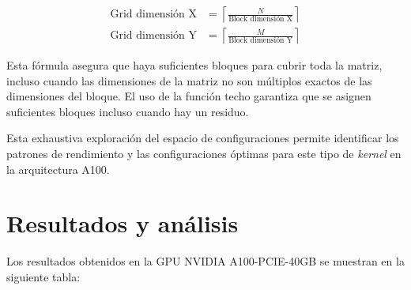         \begin{align*}
            \text{Grid dimensión X} &= \left\lceil \frac{N}{\text{Block dimensión X}} \right\rceil\\
            \text{Grid dimensión Y} &= \left\lceil \frac{M}{\text{Block dimensión Y}} \right\rceil
        \end{align*}
        
        Esta fórmula asegura que haya suficientes bloques para cubrir toda la matriz, incluso cuando las dimensiones de la matriz no son múltiplos exactos de las dimensiones del bloque. El uso de la función techo garantiza que se asignen suficientes bloques incluso cuando hay un residuo.
        
        Esta exhaustiva exploración del espacio de configuraciones permite identificar los patrones de rendimiento y las configuraciones óptimas para este tipo de \textit{kernel} en la arquitectura A100.

\newpage

\section{Resultados y análisis}

    Los resultados obtenidos en la GPU NVIDIA A100-PCIE-40GB se muestran en la siguiente tabla:

